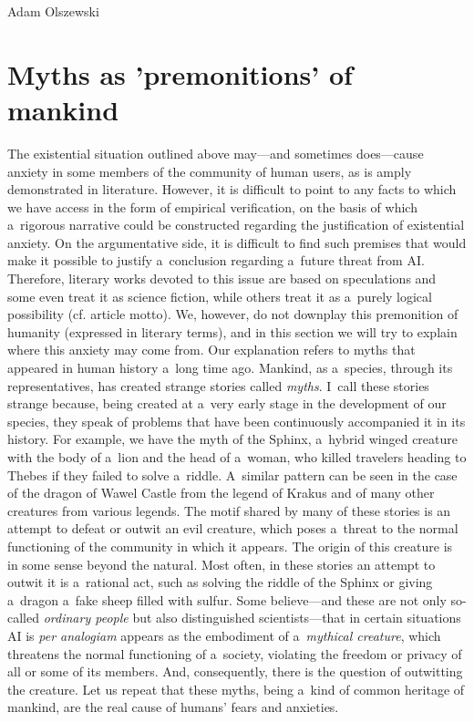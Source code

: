 \begin{artengenv}{Adam Olszewski}
\section{Myths as 'premonitions' of mankind}
The existential situation outlined above may---and sometimes does---cause anxiety in some members of the community of human users, as is amply demonstrated in literature. However, it is difficult to point to any facts to which we have access in the form of empirical verification, on the basis of which a~rigorous narrative could be constructed regarding the justification of existential anxiety. On the argumentative side, it is difficult to find such premises that would make it possible to justify a~conclusion regarding a~future threat from AI. Therefore, literary works devoted to this issue are based on speculations and some even treat it as science fiction, while others treat it as a~purely logical possibility (cf. article motto). We, however, do not downplay this premonition of humanity (expressed in literary terms), and in this section we will try to explain where this anxiety may come from. Our explanation refers to myths that appeared in human history a~long time ago. Mankind, as a~species, through its representatives, has created strange stories called \textit{myths}. I~call these stories strange because, being created at a~very early stage in the development of our species, they speak of problems that have been continuously accompanied it in its history. For example, we have the myth of the Sphinx, a~hybrid winged creature with the body of a~lion and the head of a~woman, who killed travelers heading to Thebes if they failed to solve a~riddle. A~similar pattern can be seen in the case of the dragon of Wawel Castle from the legend of Krakus and of many other creatures from various legends. The motif shared by many of these stories is an attempt to defeat or outwit an evil creature, which poses a~threat to the normal functioning of the community in which it appears. The origin of this creature is in some sense beyond the natural. Most often, in these stories an attempt to outwit it is a~rational act, such as solving the riddle of the Sphinx or giving a~dragon a~fake sheep filled with sulfur. Some believe---and these are not only so-called \textit{ordinary people} but also distinguished scientists---that in certain situations AI is \textit{per analogiam} appears as the embodiment of a~\textit{mythical creature}, which threatens the normal functioning of a~society, violating the freedom or privacy of all or some of its members. And, consequently, there is the question of outwitting the creature. Let us repeat that these myths, being a~kind of common heritage of mankind, are the real cause of humans' fears and anxieties.


\end{artengenv}
